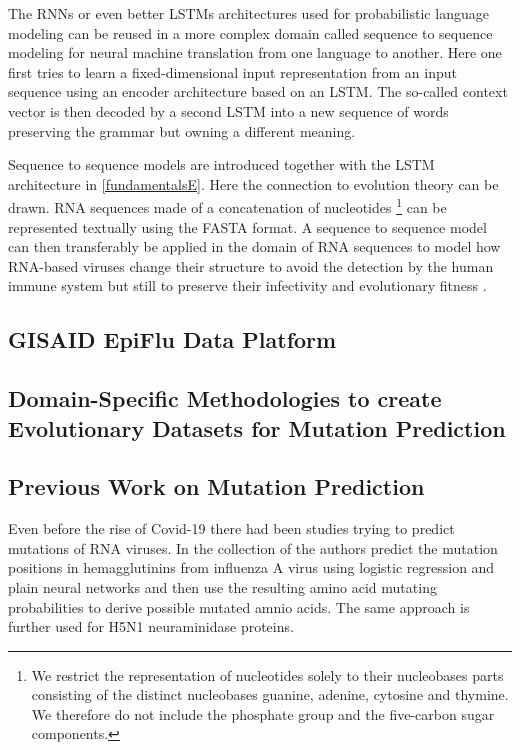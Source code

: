 The \acp{RNN} or even better \acp{LSTM} architectures used for probabilistic language modeling can be reused in a more complex domain called sequence to sequence modeling for neural machine translation from one language to another. Here one first tries to learn a fixed-dimensional input representation from an input sequence using an encoder architecture based on an \ac{LSTM}. The so-called context vector is then decoded by a second \ac{LSTM} into a new sequence of words preserving the grammar but owning a different meaning. \cite{Sutskever2014}

Sequence to sequence models are introduced together with the \ac{LSTM} architecture in \autoref{fundamentalsE}. Here the connection to evolution theory can be drawn. \ac{RNA} sequences made of a concatenation of nucleotides \footnote{We restrict the representation of nucleotides solely to their nucleobases parts consisting of the distinct nucleobases guanine, adenine, cytosine and thymine. We therefore do not include the phosphate group and the five-carbon sugar components.} can be represented textually using the FASTA format. A sequence to sequence model can then transferably be applied in the domain of \ac{RNA} sequences to model how \ac{RNA}-based viruses change their structure to avoid the detection by the human immune system but still to preserve their infectivity and evolutionary fitness \cite{Hie2021}. 

\subsection{GISAID EpiFlu Data Platform} \label{fundamentalsB}

\subsection{Domain-Specific Methodologies to create Evolutionary  Datasets for Mutation Prediction} \label{fundamentalsC}

\subsection{Previous Work on Mutation Prediction} \label{fundamentalsD}

Even before the rise of Covid-19 there had been studies trying to predict mutations of RNA viruses. In the collection of \cite{Wu2007, Yan2007, Wu2008} the authors predict the mutation positions in hemagglutinins from influenza A virus using logistic regression and plain neural networks and then use the resulting amino acid mutating probabilities to derive possible mutated amnio acids. The same approach is further used for H5N1 neuraminidase proteins. 

